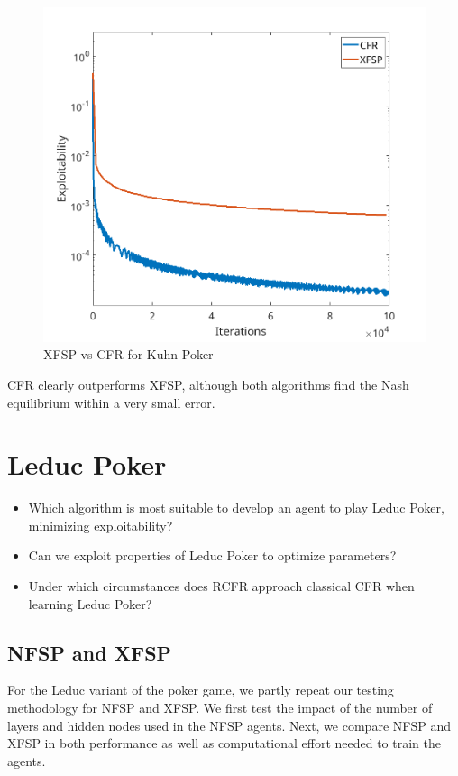 \documentclass[10pt,a4paper]{article}
\begin{document}
\begin{figure}[h]
\centering
\includegraphics[scale=0.4]{Figures/cfr_vs_xfsp_kuhn.png}
\caption{XFSP vs CFR for Kuhn Poker}
\end{figure}

CFR clearly outperforms XFSP, although both algorithms find the Nash equilibrium within a very small error.



\section{Leduc Poker}
\begin{tcolorbox}
\begin{itemize}
\item{Which algorithm is most suitable to develop an agent to play Leduc Poker, minimizing exploitability?}
\item{Can we exploit properties of Leduc Poker to optimize parameters?}
\item{Under which circumstances does RCFR approach classical CFR when learning Leduc Poker?}
\end{itemize}
\end{tcolorbox}
\subsection{NFSP and XFSP}
For the Leduc variant of the poker game, we partly repeat our testing methodology for NFSP and XFSP. We first test the impact of the number of layers and hidden nodes used in the NFSP agents. Next, we compare NFSP and XFSP in both performance as well as computational effort needed to train the agents.
 
\end{document}
